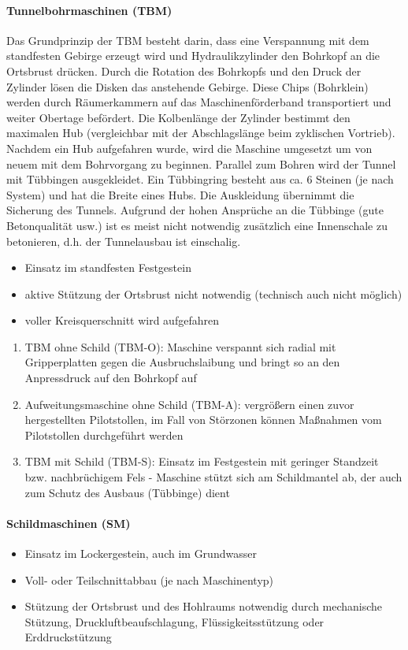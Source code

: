 \paragraph{Tunnelbohrmaschinen (TBM)}
Das Grundprinzip der TBM besteht darin, dass eine Verspannung mit dem standfesten Gebirge erzeugt wird und Hydraulikzylinder den Bohrkopf an die Ortsbrust drücken. Durch die Rotation des Bohrkopfs und den Druck der Zylinder lösen die Disken das anstehende Gebirge. Diese Chips (Bohrklein) werden durch Räumerkammern auf das Maschinenförderband transportiert und weiter Obertage befördert. Die Kolbenlänge der Zylinder bestimmt den maximalen Hub (vergleichbar mit der Abschlagslänge beim zyklischen Vortrieb). Nachdem ein Hub aufgefahren wurde, wird die Maschine umgesetzt um von neuem mit dem Bohrvorgang zu beginnen. Parallel zum Bohren wird der Tunnel mit Tübbingen ausgekleidet. Ein Tübbingring besteht aus ca. 6 Steinen (je nach System) und hat die Breite eines Hubs. Die Auskleidung übernimmt die Sicherung des Tunnels. Aufgrund der hohen Ansprüche an die Tübbinge (gute Betonqualität usw.) ist es meist nicht notwendig zusätzlich eine Innenschale zu betonieren, d.h. der Tunnelausbau ist einschalig.

\begin{itemize}
\item Einsatz im standfesten Festgestein
\item aktive Stützung der Ortsbrust nicht notwendig (technisch auch nicht möglich)
\item voller Kreisquerschnitt wird aufgefahren
\end{itemize}
\begin{enumerate}
\item TBM ohne Schild (TBM-O): Maschine verspannt sich radial mit Gripperplatten gegen die Ausbruchslaibung und bringt so an den Anpressdruck auf den Bohrkopf auf
\item Aufweitungsmaschine ohne Schild (TBM-A): vergrößern einen zuvor hergestellten Pilotstollen, im Fall von Störzonen können Maßnahmen vom Pilotstollen durchgeführt werden
\item TBM mit Schild (TBM-S): Einsatz im Festgestein mit geringer Standzeit bzw. nachbrüchigem Fels - Maschine stützt sich am Schildmantel ab, der auch zum Schutz des Ausbaus (Tübbinge) dient
\end{enumerate}
\paragraph{Schildmaschinen (SM)}
\begin{itemize}
\item Einsatz im Lockergestein, auch im Grundwasser
\item Voll- oder Teilschnittabbau (je nach Maschinentyp)
\item Stützung der Ortsbrust und des Hohlraums notwendig durch mechanische Stützung, Druckluftbeaufschlagung, Flüssigkeitsstützung oder Erddruckstützung
\end{itemize}